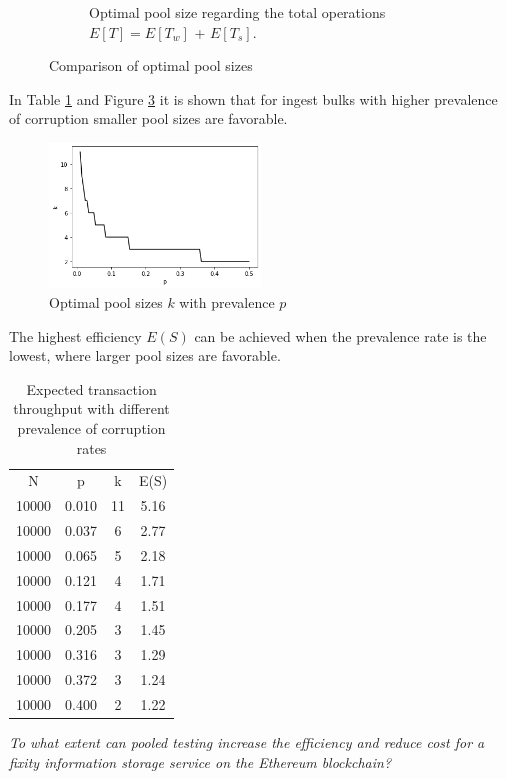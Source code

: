 \begin{figure}[b]
\begin{subfigure}{6cm}
        \caption{Optimal pool size regarding the total operations $E[T] = E[T_w]$ + $E[T_s]$.}\label{fig:expected_operations}
    \end{subfigure}
    \caption{Comparison of optimal pool sizes }%
    \label{fig:optimal_pool_size}%
\end{figure}
In Table \ref{tb:expected costs} and Figure \ref{fig:pool-sizes} it is shown that for ingest bulks with higher prevalence of corruption smaller pool sizes are favorable.
\begin{figure}[h]%
    \centering
    \caption{Optimal pool sizes $k$ with prevalence $p$}\label{fig:pool-sizes}
    \includegraphics[width=0.5\textwidth]{graphics/poolsizes.png}
\end{figure}
The highest efficiency $E(S)$ can be achieved when the prevalence rate is the lowest, where larger pool sizes are favorable.
\begin{table}[h]
    \caption{Expected transaction throughput with different prevalence of corruption rates}
    \centering
    \begin{tabular}{ c c c c}
    \label{tb:expected costs}
     N & p & k & E(S) \\ 
     10000 & 0.010 & 11 & 5.16 \\ 
     \hline
     10000 & 0.037 & 6 & 2.77 \\  
     \hline
     10000 & 0.065 & 5 & 2.18 \\  
     \hline
     10000 & 0.121 & 4 & 1.71 \\  
     \hline
     10000 & 0.177 & 4 & 1.51  \\
     \hline
     10000 & 0.205 & 3 & 1.45  \\
     \hline
     10000 & 0.316 & 3 & 1.29  \\
     \hline
     10000 & 0.372 & 3 & 1.24  \\
     \hline
     10000 & 0.400 & 2 & 1.22  
    \end{tabular}
\end{table}

\textit{To what extent can pooled testing increase the efficiency and reduce cost for a fixity information storage service on the Ethereum blockchain?}


